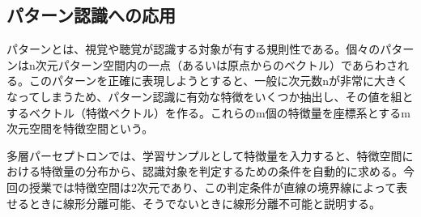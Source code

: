 \documentclass[final]{jarticle}[2012/05/15]
\begin{document}
\subsection{パターン認識への応用}
パターンとは、視覚や聴覚が認識する対象が有する規則性である。個々のパターンはn次元パターン空間内の一点（あるいは原点からのベクトル）であらわされる。このパターンを正確に表現しようとすると、一般に次元数nが非常に大きくなってしまうため、パターン認識に有効な特徴をいくつか抽出し、その値を組とするベクトル（特徴ベクトル）を作る。これらのm個の特徴量を座標系とするm次元空間を特徴空間という。\par
多層パーセプトロンでは、学習サンプルとして特徴量を入力すると、特徴空間における特徴量の分布から、認識対象を判定するための条件を自動的に求める。今回の授業では特徴空間は2次元であり、この判定条件が直線の境界線によって表せるときに線形分離可能、そうでないときに線形分離不可能と説明する。\par
\pagebreak
\end{document}
